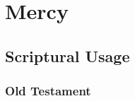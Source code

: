 \section{Mercy}
	\label{MERCY}
	





\subsection{Scriptural Usage} %
	\label{MERCY-SCRIPTURES}

	\subsubsection{Old Testament} %
		\label{MERCY-OT}
	
	

